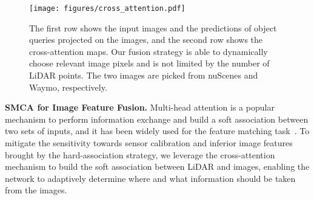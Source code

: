 \begin{figure}[t]
	\vspace{-0.5cm}
	\setlength{\abovecaptionskip}{0.0cm}
	\setlength{\belowcaptionskip}{-0.45cm}
	\center
    \texttt{[image: figures/cross\_attention.pdf]}
    \caption{The first row shows the input images and the predictions of object queries projected on the images, and the second row shows the cross-attention maps. Our fusion strategy is able to dynamically choose relevant image pixels and is not limited by the number of LiDAR {points}. The two images are picked from nuScenes and Waymo, respectively.}
    \label{fig:cross_attention}
\end{figure}

\noindent\textbf{SMCA for Image Feature Fusion.}
\label{subsubsec:img_fusion}
Multi-head attention is a popular mechanism to perform information exchange and build {a soft association} 
between two sets of inputs, and it has been widely used {for the feature matching task}~\cite{Sarlin2020SuperGlueLF, Sun2021LoFTRDL}. To mitigate the sensitivity towards sensor calibration and inferior image features brought by the hard-association strategy, we leverage the cross-attention mechanism to build {the soft association} between LiDAR and images, enabling the network to adaptively determine where and what information should be taken from the images. 

